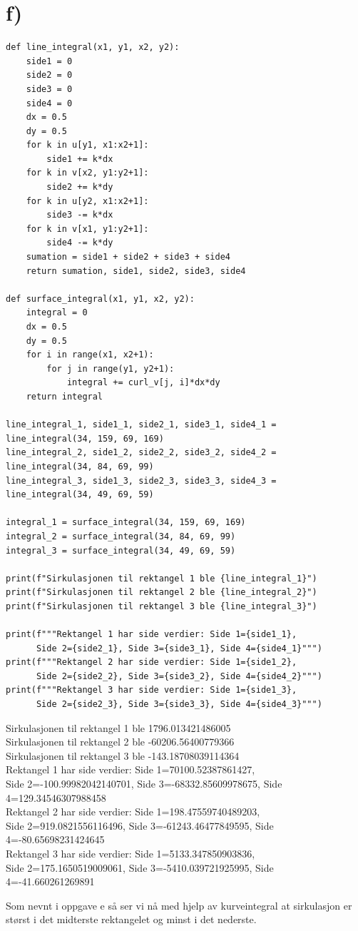 \documentclass[a4paper,10pt,norsk]{article}
\begin{document}
	\section*{f)}\label{ass:f}
\begin{lstlisting}
def line_integral(x1, y1, x2, y2):
    side1 = 0
    side2 = 0
    side3 = 0
    side4 = 0
    dx = 0.5
    dy = 0.5
    for k in u[y1, x1:x2+1]:
        side1 += k*dx
    for k in v[x2, y1:y2+1]:
        side2 += k*dy
    for k in u[y2, x1:x2+1]:
        side3 -= k*dx
    for k in v[x1, y1:y2+1]:
        side4 -= k*dy
    sumation = side1 + side2 + side3 + side4
    return sumation, side1, side2, side3, side4

def surface_integral(x1, y1, x2, y2):
    integral = 0
    dx = 0.5
    dy = 0.5
    for i in range(x1, x2+1):
        for j in range(y1, y2+1):
            integral += curl_v[j, i]*dx*dy
    return integral

line_integral_1, side1_1, side2_1, side3_1, side4_1 = line_integral(34, 159, 69, 169)
line_integral_2, side1_2, side2_2, side3_2, side4_2 = line_integral(34, 84, 69, 99)
line_integral_3, side1_3, side2_3, side3_3, side4_3 = line_integral(34, 49, 69, 59)

integral_1 = surface_integral(34, 159, 69, 169)
integral_2 = surface_integral(34, 84, 69, 99)
integral_3 = surface_integral(34, 49, 69, 59)

print(f"Sirkulasjonen til rektangel 1 ble {line_integral_1}")
print(f"Sirkulasjonen til rektangel 2 ble {line_integral_2}")
print(f"Sirkulasjonen til rektangel 3 ble {line_integral_3}")

print(f"""Rektangel 1 har side verdier: Side 1={side1_1},
      Side 2={side2_1}, Side 3={side3_1}, Side 4={side4_1}""")
print(f"""Rektangel 2 har side verdier: Side 1={side1_2},
      Side 2={side2_2}, Side 3={side3_2}, Side 4={side4_2}""")
print(f"""Rektangel 3 har side verdier: Side 1={side1_3},
      Side 2={side2_3}, Side 3={side3_3}, Side 4={side4_3}""")
\end{lstlisting}
\begin{tcolorbox}
Sirkulasjonen til rektangel 1 ble 1796.013421486005\\
Sirkulasjonen til rektangel 2 ble -60206.56400779366\\
Sirkulasjonen til rektangel 3 ble -143.18708039114364\\
Rektangel 1 har side verdier: Side 1=70100.52387861427,\\
      Side 2=-100.99982042140701, Side 3=-68332.85609978675, Side 4=129.34546307988458\\
Rektangel 2 har side verdier: Side 1=198.47559740489203,\\
      Side 2=919.0821556116496, Side 3=-61243.46477849595, Side 4=-80.65698231424645\\
Rektangel 3 har side verdier: Side 1=5133.347850903836,\\
      Side 2=175.1650519009061, Side 3=-5410.039721925995, Side 4=-41.660261269891
\end{tcolorbox}
Som nevnt i oppgave e så ser vi nå med hjelp av kurveintegral at sirkulasjon er størst i det midterste rektangelet og minst i det nederste.
	
\end{document}

